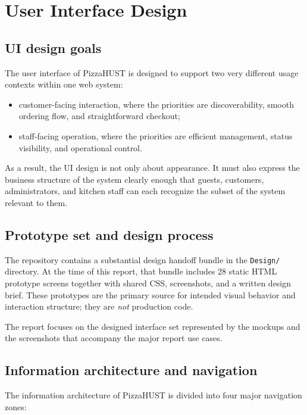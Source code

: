 \section{User Interface Design}

\subsection{UI design goals}

The user interface of PizzaHUST is designed to support two very different usage contexts within one web system:

\begin{itemize}
    \item customer-facing interaction, where the priorities are discoverability, smooth ordering flow, and straightforward checkout;
    \item staff-facing operation, where the priorities are efficient management, status visibility, and operational control.
\end{itemize}

As a result, the UI design is not only about appearance. It must also express the business structure of the system clearly enough that guests, customers, administrators, and kitchen staff can each recognize the subset of the system relevant to them.

\subsection{Prototype set and design process}

The repository contains a substantial design handoff bundle in the \texttt{Design/} directory. At the time of this report, that bundle includes 28 static HTML prototype screens together with shared CSS, screenshots, and a written design brief. These prototypes are the primary source for intended visual behavior and interaction structure; they are \emph{not} production code.

The report focuses on the designed interface set represented by the mockups and the screenshots that accompany the major report use cases.

\subsection{Information architecture and navigation}

The information architecture of PizzaHUST is divided into four major navigation zones:

